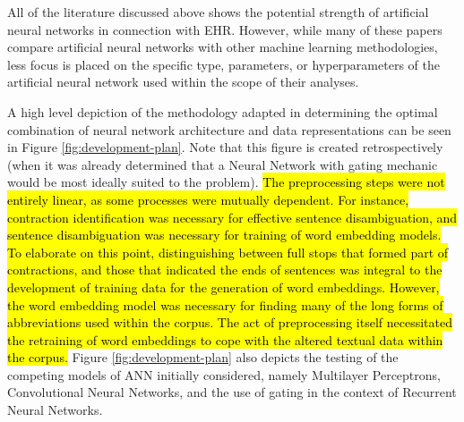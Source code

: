 
All of the literature discussed above shows the potential strength of artificial neural networks in connection with EHR. However, while many of these papers compare artificial neural networks with other machine learning methodologies, less focus is placed on the specific type, parameters, or hyperparameters of the artificial neural network used within the scope of their analyses. 






A high level depiction of the methodology adapted in determining the optimal combination of neural network architecture and data representations can be seen in Figure \ref{fig:development-plan}. Note that this figure is created retrospectively (when it was already determined that a Neural Network with gating mechanic would be most ideally suited to the problem). \hl{The preprocessing steps were not entirely linear, as some processes were mutually dependent. For instance, contraction identification was necessary for effective sentence disambiguation, and sentence disambiguation was necessary for training of word embedding models. To elaborate on this point, distinguishing between full stops that formed part of contractions, and those that indicated the ends of sentences was integral to the development of training data for the generation of word embeddings.  However, the word embedding model was necessary for finding many of the long forms of abbreviations used within the corpus. The act of preprocessing itself necessitated the retraining of word embeddings to cope with the altered textual data within the corpus.} Figure \ref{fig:development-plan} also depicts the testing of the competing models of ANN initially considered, namely Multilayer Perceptrons, Convolutional Neural Networks, and the use of gating in the context of Recurrent Neural Networks. 









